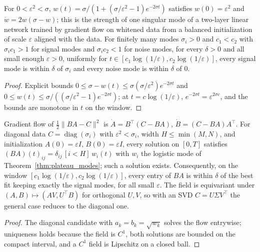 \begin{theorem}\label{thm:plateau_modes}
\leanok
For $0<\varepsilon^2<\sigma$, $w(t)=\sigma/(1+(\sigma/\varepsilon^2-1)e^{-2\sigma t})$
satisfies $w(0)=\varepsilon^2$ and $\dot w=2w(\sigma-w)$; this is the strength of one
singular mode of a two-layer linear network trained by gradient flow on whitened
data from a balanced initialization of scale $\varepsilon$ aligned with the data.
For finitely many modes $\sigma_i>0$ and $c_1<c_2$ with $\sigma_ic_1>1$ for signal
modes and $\sigma_ic_2<1$ for noise modes, for every $\delta>0$ and all small
enough $\varepsilon>0$, uniformly for $t\in[c_1\log(1/\varepsilon),c_2\log(1/\varepsilon)]$,
every signal mode is within $\delta$ of $\sigma_i$ and every noise mode is within
$\delta$ of $0$.
\end{theorem}
\begin{proof}
\leanok
Explicit bounds $0\le\sigma-w(t)\le\sigma(\sigma/\varepsilon^2)e^{-2\sigma t}$ and
$0\le w(t)\le\sigma/((\sigma/\varepsilon^2-1)e^{-2\sigma t})$; at
$t=c\log(1/\varepsilon)$, $e^{-2\sigma t}=\varepsilon^{2\sigma c}$, and the bounds are
monotone in $t$ on the window.
\end{proof}

\begin{theorem}\label{thm:plateau_flow}
\leanok
{}
Gradient flow of $\tfrac12\|BA-C\|^2$ is $\dot A=B^\top(C-BA)$,
$\dot B=(C-BA)A^\top$. For diagonal data $C=\operatorname{diag}(\sigma_i)$ with
$\varepsilon^2<\sigma_i$, width $H\le\min(M,N)$, and initialization
$A(0)=\varepsilon I$, $B(0)=\varepsilon I$, every solution on $[0,T]$ satisfies
$(BA)(t)_{ij}=\delta_{ij}\,[i<H]\,w_i(t)$ with $w_i$ the logistic mode of
Theorem~\ref{thm:plateau_modes}; such a solution exists. Consequently, on the
window $[c_1\log(1/\varepsilon),c_2\log(1/\varepsilon)]$, every entry of $BA$ is
within $\delta$ of the best fit keeping exactly the signal modes, for all small
$\varepsilon$. The field is equivariant under $(A,B)\mapsto(AV,U^\top B)$ for
orthogonal $U,V$, so with an SVD $C=U\Sigma V^\top$ the general case reduces to
the diagonal one.
\end{theorem}
\begin{proof}
\leanok
The diagonal candidate with $a_k=b_k=\sqrt{w_k}$ solves the flow entrywise;
uniqueness holds because the field is $C^1$, both solutions are bounded on the
compact interval, and a $C^1$ field is Lipschitz on a closed ball.
\end{proof}

